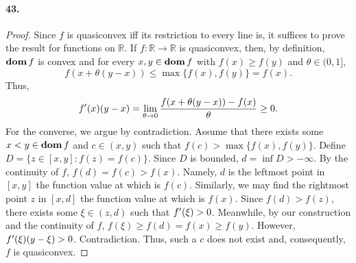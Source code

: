   \paragraph{43.}
  \begin{proof}
    Since $f$ is quasiconvex iff its restriction to every line is, it suffices
    to prove the result for functions on $\mathbb{R}$. If $f:\mathbb{R}\to
    \mathbb{R}$ is quasiconvex, then, by definition, $\operatorname{\mathbf{dom}} f$ is convex and
    for every $x,y\in\operatorname{\mathbf{dom}} f$ with $f(x)\ge f(y)$ and $\theta\in(0,1]$,
    \[
      f(x+\theta(y-x))\le \max\{f(x),f(y)\}=f(x).
    \]
    Thus,
    \[
      f^\prime(x)(y-x)=\lim_{\theta\to0}\frac{f(x+\theta(y-x))-f(x)}{\theta}\ge 0.
    \]
    For the converse, we argue by contradiction. Assume that there exists some
    $x<y\in\operatorname{\mathbf{dom}} f$ and $c\in(x,y)$ such that $f(c)>\max\{f(x),f(y)\}$. Define 
    $D=\{z\in[x,y]:f(z)=f(c)\}$. Since $D$ is bounded, $d=\inf D>-\infty$. By
    the continuity of $f$, $f(d)=f(c)>f(x)$. Namely, $d$ is the leftmost point
    in $[x,y]$ the function value at which is $f(c)$. Similarly, we may find
    the rightmost point $z$ in $[x,d]$ the function value at which is $f(x)$.
    Since $f(d)>f(z)$, there exists some $\xi\in(z,d)$ such that $f^\prime(\xi)>0$.
    Meanwhile, by our construction and the continuity of $f$, $f(\xi)\ge f(d)=
    f(x)\ge f(y)$. However, $f^\prime(\xi)(y-\xi)>0$. Contradiction. Thus, such a
    $c$ does not exist and, consequently, $f$ is quasiconvex.
  \end{proof}


















